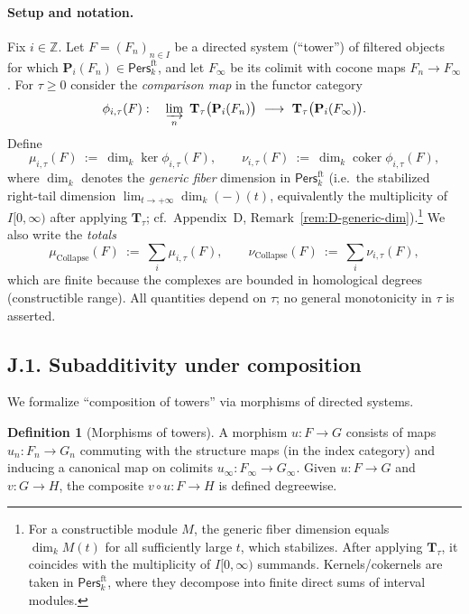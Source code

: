 \documentclass[11pt]{article}
\newcommand{\Pers}{\mathsf{Pers}}
\numberwithin{equation}{section}
\theoremstyle{definition}
\newtheorem{definition}[theorem]{Definition}
\DeclareRobustCommand{\muc}{\mu_{\mathrm{Collapse}}}
\DeclareRobustCommand{\nuc}{\nu_{\mathrm{Collapse}}}
\begin{document}
\paragraph{Setup and notation.}
Fix \(i\in\mathbb{Z}\).
Let \(F=(F_n)_{n\in I}\) be a directed system (``tower'') of filtered objects for which \(\mathbf{P}_i(F_n)\in\Pers^{\mathrm{ft}}_k\), and let \(F_\infty\) be its colimit with cocone maps \(F_n\to F_\infty\).
For \(\tau\ge 0\) consider the \emph{comparison map} in the functor category
\begin{equation}\label{J:eq:phi}
\phi_{i,\tau}(F):\quad
\varinjlim_{n}\ \mathbf{T}_\tau\big(\mathbf{P}_i(F_n)\big)\ \longrightarrow\ \mathbf{T}_\tau\big(\mathbf{P}_i(F_\infty)\big).
\end{equation}
Define
\begin{equation}\label{J:eq:mu-nu}
\mu_{i,\tau}(F)\ :=\ \dim_k \ker \phi_{i,\tau}(F),\qquad
\nu_{i,\tau}(F)\ :=\ \dim_k \operatorname{coker} \phi_{i,\tau}(F),
\end{equation}
where \(\dim_k\) denotes the \emph{generic fiber} dimension in \(\Pers^{\mathrm{ft}}_k\) (i.e.\ the stabilized right-tail dimension \(\lim_{t\to+\infty}\dim_k(-)(t)\), equivalently the multiplicity of \(I[0,\infty)\) after applying \(\mathbf{T}_\tau\); cf.\ Appendix~D, Remark~\ref{rem:D-generic-dim}).\footnote{For a constructible module \(M\), the generic fiber dimension equals \(\dim_k M(t)\) for all sufficiently large \(t\), which stabilizes. After applying \(\mathbf{T}_\tau\), it coincides with the multiplicity of \(I[0,\infty)\) summands. Kernels/cokernels are taken in \(\Pers^{\mathrm{ft}}_k\), where they decompose into finite direct sums of interval modules.}
We also write the \emph{totals}
\begin{equation}\label{J:eq:totals}
\muc(F)\ :=\ \sum_{i}\mu_{i,\tau}(F),\qquad
\nuc(F)\ :=\ \sum_{i}\nu_{i,\tau}(F),
\end{equation}
which are finite because the complexes are bounded in homological degrees (constructible range).
All quantities depend on \(\tau\); no general monotonicity in \(\tau\) is asserted.

\subsection*{J.1. Subadditivity under composition}
We formalize ``composition of towers'' via morphisms of directed systems.

\begin{definition}[Morphisms of towers]
A morphism \(u:F\to G\) consists of maps \(u_n:F_n\to G_n\) commuting with the structure maps (in the index category) and inducing a canonical map on colimits \(u_\infty:F_\infty\to G_\infty\).
Given \(u:F\to G\) and \(v:G\to H\), the composite \(v\circ u:F\to H\) is defined degreewise.
\end{definition}
\end{document}
